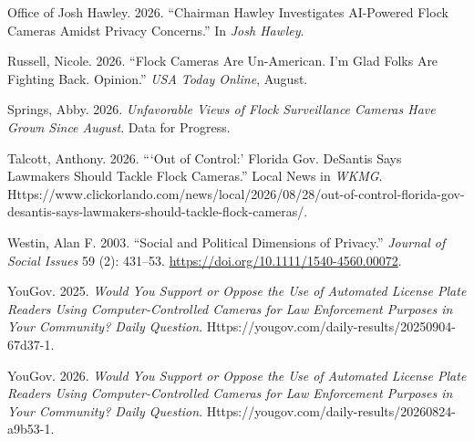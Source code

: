 \documentclass[
  american,
  12pt,
  letterpaper,
]{article}
\newlength{\cslhangindent}
\newenvironment{CSLReferences}[2] %
 {\begin{list}{}{%
  \setlength{\itemindent}{0pt}
  \setlength{\leftmargin}{0pt}
  \setlength{\parsep}{0pt}
  \ifodd #1
   \setlength{\leftmargin}{\cslhangindent}
   \setlength{\itemindent}{-1\cslhangindent}
  \fi
  \setlength{\itemsep}{#2\baselineskip}}}
 {\end{list}}
\renewenvironment{CSLReferences}[2]
  {\begin{list}{}{%
    \setlength{\itemindent}{0pt}%
    \setlength{\leftmargin}{0pt}%
    \setlength{\rightmargin}{0pt}%
    \setlength{\parsep}{0pt}%
    \setlength{\topsep}{0pt}%
    \setlength{\partopsep}{0pt}%
    \ifodd #1%
      \setlength{\leftmargin}{\cslhangindent}%
      \setlength{\itemindent}{-1\cslhangindent}%
    \fi%
    \setlength{\itemsep}{#2\baselineskip}%
  }}
  {\end{list}}
\begin{document}
\begin{singlespace}
\begin{CSLReferences}{1}{1}
Office of Josh Hawley. 2026. {``Chairman {Hawley Investigates AI-Powered
Flock Cameras Amidst Privacy Concerns}.''} In \emph{Josh Hawley}.

Russell, Nicole. 2026. {``Flock Cameras Are Un-{American}. {I}'m Glad
Folks Are Fighting Back. \textbar{} {Opinion}.''} \emph{USA Today
Online}, August.

Springs, Abby. 2026. \emph{Unfavorable {Views} of {Flock Surveillance
Cameras Have Grown Since August}}. Data for Progress.

Talcott, Anthony. 2026. {``{`{Out} of Control:'} {Florida Gov}.
{DeSantis} Says Lawmakers Should Tackle {Flock} Cameras.''} Local News
in \emph{WKMG}.
Https://www.clickorlando.com/news/local/2026/08/28/out-of-control-florida-gov-desantis-says-lawmakers-should-tackle-flock-cameras/.

Westin, Alan F. 2003. {``Social and {Political Dimensions} of
{Privacy}.''} \emph{Journal of Social Issues} 59 (2): 431--53.
\url{https://doi.org/10.1111/1540-4560.00072}.

YouGov. 2025. \emph{Would You Support or Oppose the Use of Automated
License Plate Readers Using Computer-Controlled Cameras for Law
Enforcement Purposes in Your Community? \textbar{} {Daily Question}}.
Https://yougov.com/daily-results/20250904-67d37-1.

YouGov. 2026. \emph{Would You Support or Oppose the Use of Automated
License Plate Readers Using Computer-Controlled Cameras for Law
Enforcement Purposes in Your Community? \textbar{} {Daily Question}}.
Https://yougov.com/daily-results/20260824-a9b53-1.

\end{CSLReferences}

\end{singlespace}
\end{document}
